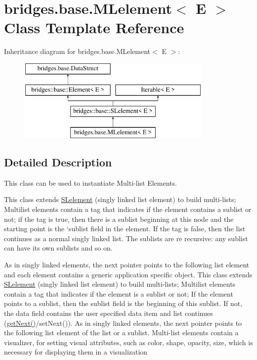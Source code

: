 \hypertarget{classbridges_1_1base_1_1_m_lelement}{}\section{bridges.\+base.\+M\+Lelement$<$ E $>$ Class Template Reference}
\label{classbridges_1_1base_1_1_m_lelement}
Inheritance diagram for bridges.\+base.\+M\+Lelement$<$ E $>$\+:\begin{figure}[H]
\begin{center}
\leavevmode
\includegraphics[height=4.000000cm]{classbridges_1_1base_1_1_m_lelement}
\end{center}
\end{figure}


\subsection{Detailed Description}
This class can be used to instantiate Multi-\/list Elements. 

This class extends \hyperlink{classbridges_1_1base_1_1_s_lelement}{S\+Lelement} (singly linked list element) to build multi-\/lists; Multilist elements contain a tag that indicates if the element contains a sublist or not; if the tag is true, then there is a sublist beginning at this node and the starting point is the `sublist\textquotesingle{} field in the element. If the tag is false, then the list continues as a normal singly linked list. The sublists are re recursive\+: any sublist can have its own sublists and so on.

As in singly linked elements, the next pointer points to the following list element and each element contains a generic application specific object. This class extends \hyperlink{classbridges_1_1base_1_1_s_lelement}{S\+Lelement} (singly linked list element) to build multi-\/lists; Multilist elements contain a tag that indicates if the element is a sublist or not; If the element points to a sublist, then the sublist field is the beginning of this sublist. If not, the data field contains the user specified data item and list continues (\hyperlink{classbridges_1_1base_1_1_m_lelement_a52ddc26a69eccda5f5b57b94cf87a545}{get\+Next()}/set\+Next()). As in singly linked elements, the next pointer points to the following list element of the list or a sublist. Multi-\/list elements contain a visualizer, for setting visual attributes, such as color, shape, opacity, size, which is necessary for displaying them in a visualization

